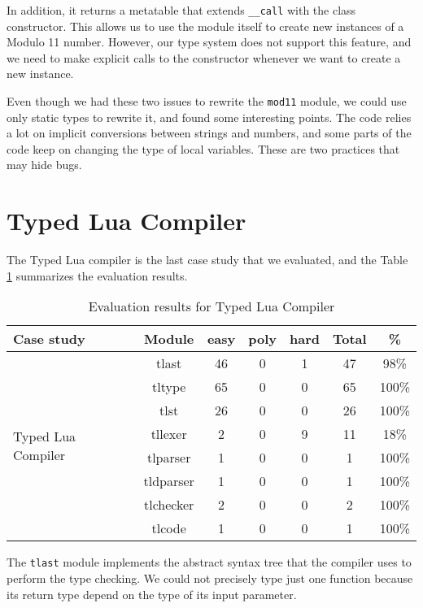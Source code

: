 In addition, it returns a metatable that extends \texttt{\string_\string_call}
with the class constructor.
This allows us to use the module itself to create new instances of a
Modulo 11 number.
However, our type system does not support this feature, and we need to
make explicit calls to the constructor whenever we want to create a
new instance.

Even though we had these two issues to rewrite the \texttt{mod11} module,
we could use only static types to rewrite it, and found some interesting
points.
The code relies a lot on implicit conversions between strings and numbers,
and some parts of the code keep on changing the type of local variables.
These are two practices that may hide bugs.

\section{Typed Lua Compiler}

The Typed Lua compiler is the last case study that we evaluated, and the
Table \ref{tab:evaltlc} summarizes the evaluation results.

\begin{table}[!ht]
\begin{center}
\begin{tabular}{|l|c|c|c|c|c|c|}
\hline
\textbf{Case study} & \textbf{Module} & \textbf{easy} & \textbf{poly} & \textbf{hard} & \textbf{Total} & \textbf{\%} \\
\hline
\multirow{8}{*}{Typed Lua Compiler}
& tlast & 46 & 0 & 1 & 47 & 98\% \\
\cline{2-7}
& tltype & 65 & 0 & 0 & 65 & 100\% \\
\cline{2-7}
& tlst & 26 & 0 & 0 & 26 & 100\% \\
\cline{2-7}
& tllexer & 2 & 0 & 9 & 11 & 18\% \\
\cline{2-7}
& tlparser & 1 & 0 & 0 & 1 & 100\% \\
\cline{2-7}
& tldparser & 1 & 0 & 0 & 1 & 100\% \\
\cline{2-7}
& tlchecker & 2 & 0 & 0 & 2 & 100\% \\
\cline{2-7}
& tlcode & 1 & 0 & 0 & 1 & 100\% \\
\hline
\end{tabular}
\end{center}
\caption{Evaluation results for Typed Lua Compiler}
\label{tab:evaltlc}
\end{table}

The \texttt{tlast} module implements the abstract syntax tree that
the compiler uses to perform the type checking.
We could not precisely type just one function because its return
type depend on the type of its input parameter.

